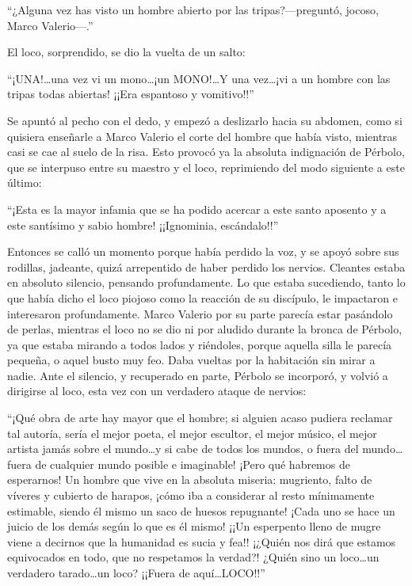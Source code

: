 \documentclass[11pt,openany]{book}
\begin{document}
“¿Alguna vez has visto un hombre abierto por las tripas?—preguntó, jocoso, Marco Valerio—.” 

El loco, sorprendido, se dio la vuelta de un salto: 

“¡UNA!\dots una vez vi un mono\dots ¡un MONO!\dots Y una vez\dots ¡vi a un hombre con las tripas todas abiertas! ¡¡Era espantoso y vomitivo!!” 

Se apuntó al pecho con el dedo, y empezó a deslizarlo hacia su abdomen, como si quisiera enseñarle a Marco Valerio el corte del hombre que había visto, mientras casi se cae al suelo de la risa. Esto provocó ya la absoluta indignación de Pérbolo, que se interpuso entre su maestro y el loco, reprimiendo del modo siguiente a este último: 

“¡Esta es la mayor infamia que se ha podido acercar a este santo aposento y a este santísimo y sabio hombre! ¡¡Ignominia, escándalo!!” 

Entonces se calló un momento porque había perdido la voz, y se apoyó sobre sus rodillas, jadeante, quizá arrepentido de haber perdido los nervios. Cleantes estaba en absoluto silencio, pensando profundamente. Lo que estaba sucediendo, tanto lo que había dicho el loco piojoso como la reacción de su discípulo, le impactaron e interesaron profundamente. Marco Valerio por su parte parecía estar pasándolo de perlas, mientras el loco no se dio ni por aludido durante la bronca de Pérbolo, ya que estaba mirando a todos lados y riéndoles, porque aquella silla le parecía pequeña, o aquel busto muy feo. Daba vueltas por la habitación sin mirar a nadie. Ante el silencio, y recuperado en parte, Pérbolo se incorporó, y volvió a dirigirse al loco, esta vez con un verdadero ataque de nervios: 

“¡Qué obra de arte hay mayor que el hombre; si alguien acaso pudiera reclamar tal autoría, sería el mejor poeta, el mejor escultor, el mejor músico, el mejor artista jamás sobre el mundo\dots y si cabe de todos los mundos, o fuera del mundo\dots fuera de cualquier mundo posible e imaginable! ¡Pero qué habremos de esperarnos! Un hombre que vive en la absoluta miseria: mugriento, falto de víveres y cubierto de harapos, ¡cómo iba a considerar al resto mínimamente estimable, siendo él mismo un saco de huesos repugnante! ¡Cada uno se hace un juicio de los demás según lo que es él mismo! ¡¡Un esperpento lleno de mugre viene a decirnos que la humanidad es sucia y fea!! ¡¿Quién nos dirá que estamos equivocados en todo, que no respetamos la verdad?! ¿Quién sino un loco\dots un verdadero tarado\dots un loco? ¡¡Fuera de aquí\dots LOCO!!” 
\end{document}
